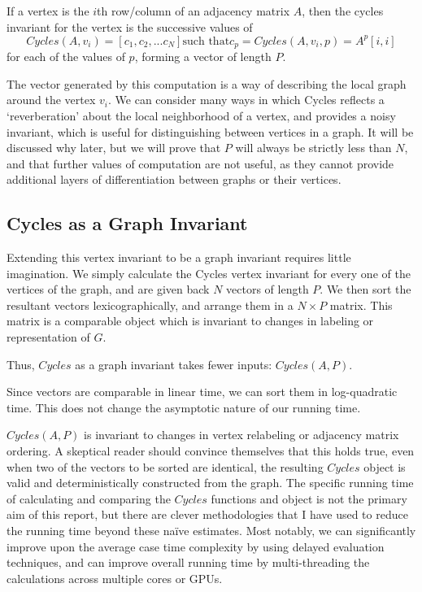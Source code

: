 If a vertex is the $i$th row/column of an adjacency matrix $A$, then the cycles invariant for the vertex is the successive values of 
$$Cycles(A, v_i) = [c_1, c_2, ... c_N] \text{such that} c_p = Cycles(A, v_i, p) = A^p[i,i]$$
for each of the values of $p$, forming a vector of length $P$.

The vector generated by this computation is a way of describing the local graph around the vertex $v_i$.
We can consider many ways in which Cycles reflects a `reverberation' about the local neighborhood of a vertex, and provides a noisy invariant, which is useful for distinguishing between vertices in a graph. 
It will be discussed why later, but we will prove that $P$ will always be strictly less than $N$, and that further values of computation are not useful, as they cannot provide additional layers of differentiation between graphs or their vertices.


\subsection{Cycles as a Graph Invariant}

Extending this vertex invariant to be a graph invariant requires little imagination. 
We simply calculate the Cycles vertex invariant for every one of the vertices of the graph, and are given back $N$ vectors of length $P$.
We then sort the resultant vectors lexicographically, and arrange them in a $N \times P$ matrix.
This matrix is a comparable object which is invariant to changes in labeling or representation of $G$.

Thus, $Cycles$ as a graph invariant takes fewer inputs: $Cycles(A, P)$.

Since vectors are comparable in linear time, we can sort them in log-quadratic time.
This does not change the asymptotic nature of our running time.

$Cycles(A, P)$ is invariant to changes in vertex relabeling or adjacency matrix ordering.
A skeptical reader should convince themselves that this holds true, even when two of the vectors to be sorted are identical, the resulting $Cycles$ object is valid and deterministically constructed from the graph.
The specific running time of calculating and comparing the $Cycles$ functions and object is not the primary aim of this report, but there are clever methodologies that I have used to reduce the running time beyond these na\"{i}ve estimates.
Most notably, we can significantly improve upon the average case time complexity by using delayed evaluation techniques, and can improve overall running time by multi-threading the calculations across multiple cores or GPUs.

